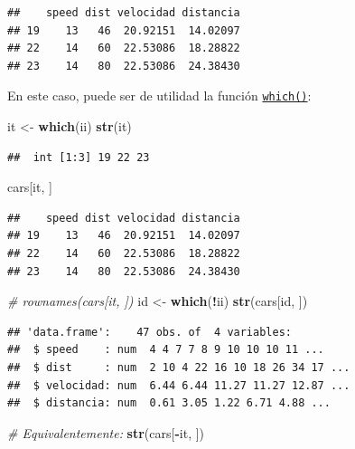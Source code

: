 \documentclass[
]{book}
\newenvironment{Shaded}{\begin{snugshade}}{\end{snugshade}}
\newcommand{\CommentTok}[1]{\textcolor[rgb]{0.56,0.35,0.01}{\textit{#1}}}
\newcommand{\FunctionTok}[1]{\textcolor[rgb]{0.13,0.29,0.53}{\textbf{#1}}}
\newcommand{\NormalTok}[1]{#1}
\newcommand{\OtherTok}[1]{\textcolor[rgb]{0.56,0.35,0.01}{#1}}
\newcommand{\SpecialCharTok}[1]{\textcolor[rgb]{0.81,0.36,0.00}{\textbf{#1}}}
\begin{document}
\begin{verbatim}
##    speed dist velocidad distancia
## 19    13   46  20.92151  14.02097
## 22    14   60  22.53086  18.28822
## 23    14   80  22.53086  24.38430
\end{verbatim}

En este caso, puede ser de utilidad la función \href{https://www.rdocumentation.org/packages/base/versions/3.6.1/topics/which}{\texttt{which()}}:

\begin{Shaded}
\begin{Highlighting}[]
\NormalTok{it }\OtherTok{\textless{}{-}} \FunctionTok{which}\NormalTok{(ii)}
\FunctionTok{str}\NormalTok{(it)}
\end{Highlighting}
\end{Shaded}

\begin{verbatim}
##  int [1:3] 19 22 23
\end{verbatim}

\begin{Shaded}
\begin{Highlighting}[]
\NormalTok{cars[it, ]}
\end{Highlighting}
\end{Shaded}

\begin{verbatim}
##    speed dist velocidad distancia
## 19    13   46  20.92151  14.02097
## 22    14   60  22.53086  18.28822
## 23    14   80  22.53086  24.38430
\end{verbatim}

\begin{Shaded}
\begin{Highlighting}[]
\CommentTok{\# rownames(cars[it, ])}
\NormalTok{id }\OtherTok{\textless{}{-}} \FunctionTok{which}\NormalTok{(}\SpecialCharTok{!}\NormalTok{ii)}
\FunctionTok{str}\NormalTok{(cars[id, ])}
\end{Highlighting}
\end{Shaded}

\begin{verbatim}
## 'data.frame':    47 obs. of  4 variables:
##  $ speed    : num  4 4 7 7 8 9 10 10 10 11 ...
##  $ dist     : num  2 10 4 22 16 10 18 26 34 17 ...
##  $ velocidad: num  6.44 6.44 11.27 11.27 12.87 ...
##  $ distancia: num  0.61 3.05 1.22 6.71 4.88 ...
\end{verbatim}

\begin{Shaded}
\begin{Highlighting}[]
\CommentTok{\# Equivalentemente:}
\FunctionTok{str}\NormalTok{(cars[}\SpecialCharTok{{-}}\NormalTok{it, ])}
\end{Highlighting}
\end{Shaded}
\end{document}
